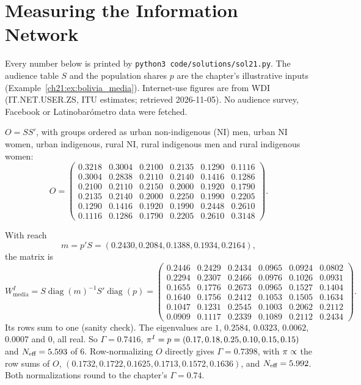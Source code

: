 \documentclass[../solutions_manual.tex]{subfiles}
\begin{document}
\ifSubfilesClassLoaded{\setcounter{chapter}{20}}{}%
\setcounter{chapter}{20}%
\chapter{Measuring the Information Network}\label{sol21}

Every number below is printed by \texttt{python3 code/solutions/sol21.py}. The audience table $S$ and the population shares $p$ are the chapter's illustrative inputs (Example~\ref{ch21:ex:bolivia_media}). Internet-use figures are from WDI (IT.NET.USER.ZS, ITU estimates; retrieved 2026-11-05). No audience survey, Facebook or Latinobar\'ometro data were fetched.


 $O = SS'$, with groups ordered as urban non-indigenous (NI) men, urban NI women, urban indigenous, rural NI, rural indigenous men and rural indigenous women:
\[
O = \begin{pmatrix}
0.3218 & 0.3004 & 0.2100 & 0.2135 & 0.1290 & 0.1116\\
0.3004 & 0.2838 & 0.2110 & 0.2140 & 0.1416 & 0.1286\\
0.2100 & 0.2110 & 0.2150 & 0.2000 & 0.1920 & 0.1790\\
0.2135 & 0.2140 & 0.2000 & 0.2250 & 0.1990 & 0.2205\\
0.1290 & 0.1416 & 0.1920 & 0.1990 & 0.2448 & 0.2610\\
0.1116 & 0.1286 & 0.1790 & 0.2205 & 0.2610 & 0.3148
\end{pmatrix}.
\]

 With reach
\[
m = p'S = (0.2430, 0.2084, 0.1388, 0.1934, 0.2164),
\]
the matrix is
{\small
\[
W^I_{\text{media}} = S\operatorname{diag}(m)^{-1}S'\operatorname{diag}(p) = \begin{pmatrix}
0.2446 & 0.2429 & 0.2434 & 0.0965 & 0.0924 & 0.0802\\
0.2294 & 0.2307 & 0.2466 & 0.0976 & 0.1026 & 0.0931\\
0.1655 & 0.1776 & 0.2673 & 0.0965 & 0.1527 & 0.1404\\
0.1640 & 0.1756 & 0.2412 & 0.1053 & 0.1505 & 0.1634\\
0.1047 & 0.1231 & 0.2545 & 0.1003 & 0.2062 & 0.2112\\
0.0909 & 0.1117 & 0.2339 & 0.1089 & 0.2112 & 0.2434
\end{pmatrix}.
\]
}
Its rows sum to one (sanity check). The eigenvalues are $1$, $0.2584$, $0.0323$, $0.0062$, $0.0007$ and $0$, all real. So $\Gamma = 0.7416$, $\pi^I = p = (0.17, 0.18, 0.25, 0.10, 0.15, 0.15)$ and $N_{\text{eff}} = 5.593$ of 6. Row-normalizing $O$ directly gives $\Gamma = 0.7398$, with $\pi \propto$ the row sums of $O$, $(0.1732, 0.1722, 0.1625, 0.1713, 0.1572, 0.1636)$, and $N_{\text{eff}} = 5.992$. Both normalizations round to the chapter's $\Gamma = 0.74$.
\end{document}
